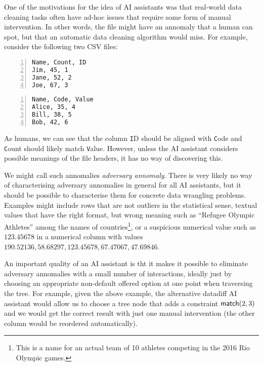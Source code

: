 \documentclass{article}
\begin{document}
One of the motivations for the idea of AI assistants was that real-world data cleaning tasks
often have ad-hoc issues that require some form of manual intervention. In other words, the 
file might have an annomaly that a human can spot, but that an automatic data cleaning algorithm
would miss. For example, consider the following two CSV files:

\vspace{0.5em}
\begin{minipage}[t]{0.5\textwidth}
\begin{Verbatim}[numbers=left,xleftmargin=3mm]
Name, Count, ID
Jim, 45, 1
Jane, 52, 2
Joe, 67, 3
\end{Verbatim}
\end{minipage}
\begin{minipage}[t]{0.5\textwidth}
\begin{Verbatim}[numbers=left,xleftmargin=3mm]
Name, Code, Value
Alice, 35, 4
Bill, 38, 5
Bob, 42, 6
\end{Verbatim}
\end{minipage}
\vspace{1em}

\noindent
As humans, we can see that the column {\texttt ID} should be aligned with {\texttt Code}
and {\texttt Count} should likely match {\texttt Value}. However, unless the AI assistant
considers possible meanings of the file headers, it has no way of discovering this. 

We might call such annomalies \emph{adversary annomaly}. There is very likely no way of 
characterising adversary annomalies in general for all AI assistants, but it should be possible
to characterise them for concrete data wrangling problems. Examples might include rows that
are not outliers in the statistical sense, textual values that have the right format, but wrong 
meaning such as ``Refugee Olympic Athletes'' among the names of countries\footnote{This is a name
for an actual team of 10 athletes competing in the 2016 Rio Olympic games.}, or a suspicious 
numerical value such as $123.45678$ in a numerical column with values 
$190.52136, 58.68297, 123.45678, 67.47067, 47.69846$.

An important quality of an AI assistant is tht it makes it possible to eliminate adversary
annomalies with a small number of interactions, ideally just by choosing an appropriate 
non-default offered option at one point when traversing the tree. For example, given the
above example, the alternative datadiff AI assistant would allow us to choose a tree node that
adds a constraint $\textnormal{\sffamily match}(2,3)$ and we would get the correct result with just one manual
intervention (the other column would be reordered automatically).
\end{document}
